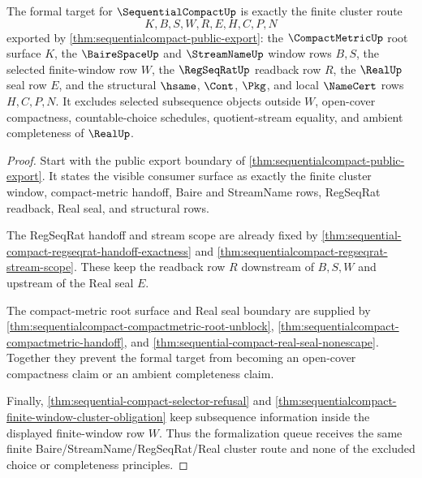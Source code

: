 \begin{theorem}
\label{thm:sequentialcompact-formal-target-scope}
The formal target for $\SequentialCompactUp$ is exactly the finite cluster route
$$
K,B,S,W,R,E,H,C,P,N
$$
exported by \autoref{thm:sequentialcompact-public-export}: the $\CompactMetricUp$ root surface $K$, the $\BaireSpaceUp$ and $\StreamNameUp$ window rows $B,S$, the selected finite-window row $W$, the $\RegSeqRatUp$ readback row $R$, the $\RealUp$ seal row $E$, and the structural $\hsame$, $\Cont$, $\Pkg$, and local $\NameCert$ rows $H,C,P,N$. It excludes selected subsequence objects outside $W$, open-cover compactness, countable-choice schedules, quotient-stream equality, and ambient completeness of $\RealUp$.
\end{theorem}
\begin{proof}
Start with the public export boundary of \autoref{thm:sequentialcompact-public-export}. It states the visible consumer surface as exactly the finite cluster window, compact-metric handoff, Baire and StreamName rows, RegSeqRat readback, Real seal, and structural rows.

The RegSeqRat handoff and stream scope are already fixed by \autoref{thm:sequential-compact-regseqrat-handoff-exactness} and \autoref{thm:sequentialcompact-regseqrat-stream-scope}. These keep the readback row $R$ downstream of $B,S,W$ and upstream of the Real seal $E$.

The compact-metric root surface and Real seal boundary are supplied by \autoref{thm:sequentialcompact-compactmetric-root-unblock}, \autoref{thm:sequentialcompact-compactmetric-handoff}, and \autoref{thm:sequential-compact-real-seal-nonescape}. Together they prevent the formal target from becoming an open-cover compactness claim or an ambient completeness claim.

Finally, \autoref{thm:sequential-compact-selector-refusal} and \autoref{thm:sequentialcompact-finite-window-cluster-obligation} keep subsequence information inside the displayed finite-window row $W$. Thus the formalization queue receives the same finite Baire/StreamName/RegSeqRat/Real cluster route and none of the excluded choice or completeness principles.
\end{proof}

